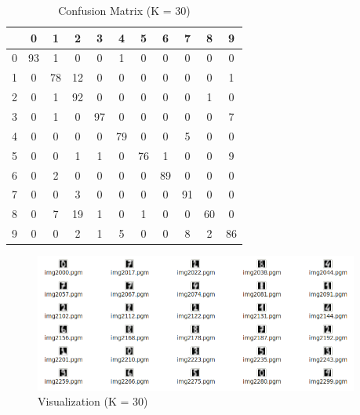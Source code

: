 \documentclass[11pt,letterpaper,oneside]{article}
\begin{document}
\begin{description}
\begin{table}[th]
\caption{Confusion Matrix (K = 30)}
\centering
\begin{tabular*}{0.6\textwidth}{@{\extracolsep{\fill}}ccccccccccc}
\hline
 & 0 & 1 & 2 & 3 & 4 & 5 & 6 & 7 & 8 & 9 \\ \hline
0& 93&  1&  0&  0&  1&  0&  0&  0&  0&  0\\
1& 0& 78& 12&  0&  0&  0&  0&  0&  0&  1\\
2& 0&  1& 92&  0&  0&  0&  0&  0&  1&  0\\
3& 0&  1&  0& 97&  0&  0&  0&  0&  0&  7\\
4& 0&  0&  0&  0& 79&  0&  0&  5&  0&  0\\
5& 0&  0&  1&  1&  0& 76&  1&  0&  0&  9\\
6& 0&  2&  0&  0&  0&  0& 89&  0&  0&  0\\
7& 0&  0&  3&  0&  0&  0&  0& 91&  0&  0\\
8& 0&  7& 19&  1&  0&  1&  0&  0& 60&  0\\
9& 0&  0&  2&  1&  5&  0&  0&  8&  2& 86\\
\hline
\end{tabular*}
\label{tab4}
\end{table}

\begin{figure}
\begin{center}
\includegraphics[width=0.95\textwidth]{fig2}
\caption{Visualization (K = 30)}
\label{fig2}
\end{center}
\end{figure}

\end{description}
\end{document}
